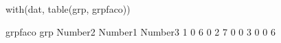 \begin{Schunk}
\begin{Sinput}
  with(dat, table(grp, grpfaco))
\end{Sinput}
\begin{Soutput}
   grpfaco
grp Number2 Number1 Number3
  1       0       6       0
  2       7       0       0
  3       0       0       6
\end{Soutput}
\end{Schunk}
